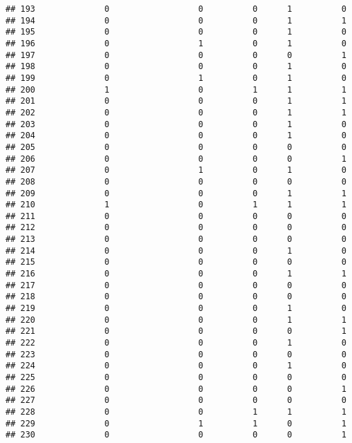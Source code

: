 \documentclass[
]{article}
\begin{document}
\begin{verbatim}
## 193              0                  0          0      1          0
## 194              0                  0          0      1          1
## 195              0                  0          0      1          0
## 196              0                  1          0      1          0
## 197              0                  0          0      0          1
## 198              0                  0          0      1          0
## 199              0                  1          0      1          0
## 200              1                  0          1      1          1
## 201              0                  0          0      1          1
## 202              0                  0          0      1          1
## 203              0                  0          0      1          0
## 204              0                  0          0      1          0
## 205              0                  0          0      0          0
## 206              0                  0          0      0          1
## 207              0                  1          0      1          0
## 208              0                  0          0      0          0
## 209              0                  0          0      1          1
## 210              1                  0          1      1          1
## 211              0                  0          0      0          0
## 212              0                  0          0      0          0
## 213              0                  0          0      0          0
## 214              0                  0          0      1          0
## 215              0                  0          0      0          0
## 216              0                  0          0      1          1
## 217              0                  0          0      0          0
## 218              0                  0          0      0          0
## 219              0                  0          0      1          0
## 220              0                  0          0      1          1
## 221              0                  0          0      0          1
## 222              0                  0          0      1          0
## 223              0                  0          0      0          0
## 224              0                  0          0      1          0
## 225              0                  0          0      0          0
## 226              0                  0          0      0          1
## 227              0                  0          0      0          0
## 228              0                  0          1      1          1
## 229              0                  1          1      0          1
## 230              0                  0          0      0          1

\end{verbatim}
\end{document}
